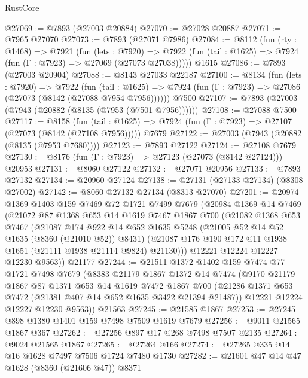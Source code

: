 \begin{lexlean}{RustCore}
\begin{coremodule}
@27069 := @7893 (@27003 @20884)
@27070 := @27028 @20887
@27071 := @7965 @27070
@27073 := @7893 (@27071 @7986)
@27084 := @8112
    (fun (rty : @1468) =>
    @7921
      (fun (lets : @7920) =>
      @7922 (fun (tail : @1625) => @7924 (fun (Γ : @7923) => @27069 (@27073 @27038)))))
    @1615
@27086 := @7893 (@27003 @20904)
@27088 := @8143 @27033 @22187
@27100 := @8134
    (fun (lets : @7920) =>
    @7922
      (fun (tail : @1625) =>
      @7924 (fun (Γ : @7923) => @27086 (@27073 (@8142 (@27088 @7954 @7956))))))
    @7500
@27107 := @7893 (@27003 (@7943 (@20882 (@8135 (@7953 (@7501 @7956))))))
@27108 := @27088 @7500
@27117 := @8158
    (fun (tail : @1625) => @7924 (fun (Γ : @7923) => @27107 (@27073 (@8142 (@27108 @7956)))))
    @7679
@27122 := @27003 (@7943 (@20882 (@8135 (@7953 @7680))))
@27123 := @7893 @27122
@27124 := @27108 @7679
@27130 := @8176 (fun (Γ : @7923) => @27123 (@27073 (@8142 @27124))) @20953
@27131 := @8060 @27122
@27132 := @27071 @20956
@27133 := @7893 @27132
@27134 := @20960 @27124
@27138 := @27131 (@27133 @27134) (@8308 @27002)
@27142 := @8060 @27132 @27134 (@8313 @27070)
@27201 := @20974
    @1369
    @1403
    @159
    @7469
    @72
    @1721
    @7499
    @7679
    (@20984
      @1369
      @14
      @7469
      (@21072
        @87
        @1368
        @653
        @14
        @1619
        @7467
        @1867
        @700
        (@21082
          @1368
          @653
          @7467
          (@21087
            @174
            @922
            @14
            @652
            @1635
            @5248
            (@21005 @52 @14 @52 @1635 (@8360 (@21010 @52)) @8431)
            (@21087 @176 @190 @172 @11 @1938 @1651 (@21111 @1938 @21114 @9824) @21130)))
        @12221
        @12224
        @12227
        @12230
        @9563))
    @21177
@27244 := @21511
    @1372
    @1402
    @159
    @7474
    @77
    @1721
    @7498
    @7679
    (@8383
      @21179
      @1867
      @1372
      @14
      @7474
      (@9170
        @21179
        @1867
        @87
        @1371
        @653
        @14
        @1619
        @7472
        @1867
        @700
        (@21286 @1371 @653 @7472 (@21381 @407 @14 @652 @1635 @3422 @21394 @21487))
        @12221
        @12224
        @12227
        @12230
        @9563))
    @21563
@27245 := @21585 @1867
@27253 := @27245 @898 @1380 @1401 @159 @7498 @7509 @1619 @7679
@27256 := @9011 @21565 @1867 @367
@27262 := @27256 @897 @17 @268 @7498 @7507 @2135
@27264 := @9024 @21565 @1867
@27265 := @27264 @166
@27274 := @27265 @335 @14 @16 @1628 @7497 @7506 @1724 @7480 @1730
@27282 := @21601 @47 @14 @47 @1628 (@8360 (@21606 @47)) @8371

\end{coremodule}
\end{lexlean}
